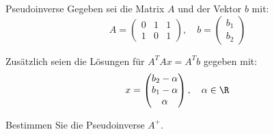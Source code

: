 \begin{example}{Pseudoinverse}
    Gegeben sei die Matrix $A$ und der Vektor $b$ mit:
    \[
        A =
        \begin{pmatrix}
            0 & 1 & 1 \\
            1 & 0 & 1
        \end{pmatrix}
        , \quad
        b =
        \begin{pmatrix}
            b_1 \\
            b_2
        \end{pmatrix}
    \]

    Zusätzlich seien die Lösungen für $A^TAx = A^Tb$ gegeben mit:
    \[
        x =
        \begin{pmatrix}
            b_2 - \alpha \\
            b_1 - \alpha \\
            \alpha
        \end{pmatrix}
        , \quad \alpha \in \R
    \]

    Bestimmen Sie die Pseudoinverse $A^+$.

    \exampleseparator


\end{example}
